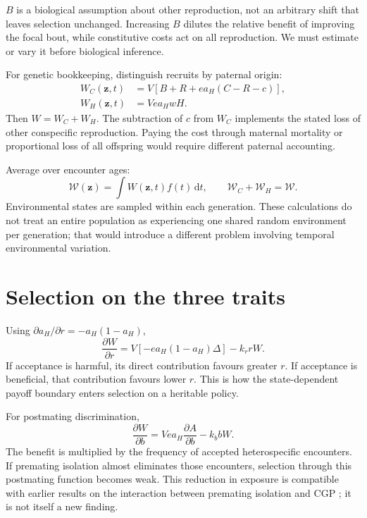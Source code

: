 \documentclass[11pt,a4paper]{article}
\newcommand{\dd}{\mathrm d}
\begin{document}
$B$ is a biological assumption about other reproduction, not an arbitrary shift that leaves selection unchanged. Increasing $B$ dilutes the relative benefit of improving the focal bout, while constitutive costs act on all reproduction. We must estimate or vary it before biological inference.

For genetic bookkeeping, distinguish recruits by paternal origin:
\begin{align}
W_C(\mathbf z,t)&=V\left[B+R+ea_H(C-R-c)\right],\label{eq:WC}\\
W_H(\mathbf z,t)&=Vea_HwH.\label{eq:WH}
\end{align}
Then $W=W_C+W_H$. The subtraction of $c$ from $W_C$ implements the stated loss of other conspecific reproduction. Paying the cost through maternal mortality or proportional loss of all offspring would require different paternal accounting.

Average over encounter ages:
\begin{equation}
\mathcal W(\mathbf z)=\int W(\mathbf z,t)f(t)\,\dd t,
\qquad \mathcal W_C+\mathcal W_H=\mathcal W.
\end{equation}
Environmental states are sampled within each generation. These calculations do not treat an entire population as experiencing one shared random environment per generation; that would introduce a different problem involving temporal environmental variation.

\section{Selection on the three traits}
Using $\partial a_H/\partial r=-a_H(1-a_H)$,
\begin{equation}
\frac{\partial W}{\partial r}
=V\left[-e a_H(1-a_H)\Delta\right]-k_r rW.
\label{eq:rgradient}
\end{equation}
If acceptance is harmful, its direct contribution favours greater $r$. If acceptance is beneficial, that contribution favours lower $r$. This is how the state-dependent payoff boundary enters selection on a heritable policy.

For postmating discrimination,
\begin{equation}
\frac{\partial W}{\partial b}
=Ve a_H\frac{\partial A}{\partial b}-k_b bW.
\label{eq:bgradient}
\end{equation}
The benefit is multiplied by the frequency of accepted heterospecific encounters. If premating isolation almost eliminates those encounters, selection through this postmating function becomes weak. This reduction in exposure is compatible with earlier results on the interaction between premating isolation and CGP \citep{LorchServedio2007}; it is not itself a new finding.
\end{document}
